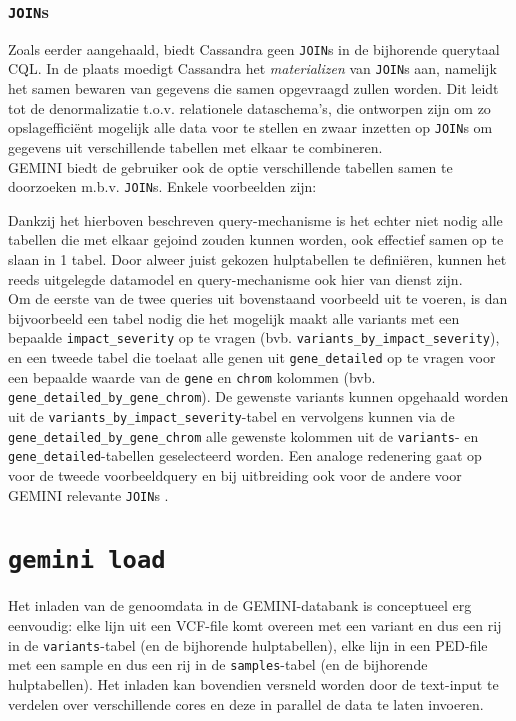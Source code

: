 \subsubsection{\texttt{JOIN}s}

Zoals eerder aangehaald, biedt Cassandra geen \texttt{JOIN}s in de bijhorende querytaal CQL. In de plaats moedigt Cassandra het \textit{materializen} van \texttt{JOIN}s aan, namelijk het samen bewaren van gegevens die samen opgevraagd zullen worden. Dit leidt tot de denormalizatie t.o.v. relationele dataschema's, die ontworpen zijn om zo opslageffici\"ent mogelijk alle data voor te stellen en zwaar inzetten op \texttt{JOIN}s om gegevens uit verschillende tabellen met elkaar te combineren.\\
GEMINI biedt de gebruiker ook de optie verschillende tabellen samen te doorzoeken m.b.v. \texttt{JOIN}s. Enkele voorbeelden zijn:



Dankzij het hierboven beschreven query-mechanisme is het echter niet nodig alle tabellen die met elkaar gejoind zouden kunnen worden, ook effectief samen op te slaan in 1 tabel. Door alweer juist gekozen hulptabellen te defini\"eren, kunnen het reeds uitgelegde datamodel en query-mechanisme ook hier van dienst zijn.\\
Om de eerste van de twee queries uit bovenstaand voorbeeld uit te voeren, is dan bijvoorbeeld een tabel nodig die het mogelijk maakt alle variants met een bepaalde \texttt{impact\_severity} op te vragen (bvb. \texttt{variants\_by\_impact\_severity}), en een tweede tabel die toelaat alle genen uit \texttt{gene\_detailed} op te vragen voor een bepaalde waarde van de \texttt{gene} en \texttt{chrom} kolommen (bvb. \texttt{gene\_detailed\_by\_gene\_chrom}). De gewenste variants kunnen opgehaald worden uit de \texttt{variants\_by\_impact\_severity}-tabel en vervolgens kunnen via de \texttt{gene\_detailed\_by\_gene\_chrom} alle gewenste kolommen uit de \texttt{variants}- en \texttt{gene\_detailed}-tabellen geselecteerd worden. Een analoge redenering gaat op voor de tweede voorbeeldquery en bij uitbreiding ook voor de andere voor GEMINI relevante \texttt{JOIN}s \cite{gemini_joins}.

\section{\texttt{gemini load}}

Het inladen van de genoomdata in de GEMINI-databank is conceptueel erg eenvoudig: elke lijn uit een VCF-file komt overeen met een variant en dus een rij in de \texttt{variants}-tabel (en de bijhorende hulptabellen), elke lijn in een PED-file met een sample en dus een rij in de \texttt{samples}-tabel (en de bijhorende hulptabellen). Het inladen kan bovendien versneld worden door de text-input te verdelen over verschillende cores en deze in parallel de data te laten invoeren.

